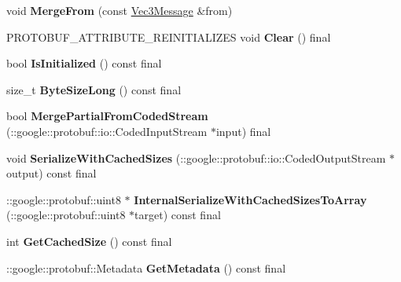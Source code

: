\begin{DoxyCompactItemize}
\item 
\mbox{\label{classtbMath_1_1Vec3Message_a94ba6277b00e325f34079ec48dfb952a}} 
void {\bfseries Merge\+From} (const \hyperlink{classtbMath_1_1Vec3Message}{Vec3\+Message} \&from)
\item 
\mbox{\label{classtbMath_1_1Vec3Message_a61f1a4a8bde658cd00386e0e2fcf8a51}} 
P\+R\+O\+T\+O\+B\+U\+F\+\_\+\+A\+T\+T\+R\+I\+B\+U\+T\+E\+\_\+\+R\+E\+I\+N\+I\+T\+I\+A\+L\+I\+Z\+ES void {\bfseries Clear} () final
\item 
\mbox{\label{classtbMath_1_1Vec3Message_a72c6ada0eb8a00f8761eecc580e08a82}} 
bool {\bfseries Is\+Initialized} () const final
\item 
\mbox{\label{classtbMath_1_1Vec3Message_a4ffc59a5652f0cc147211b41d767af5b}} 
size\+\_\+t {\bfseries Byte\+Size\+Long} () const final
\item 
\mbox{\label{classtbMath_1_1Vec3Message_a5313d2e95d614dc3e74ab5f2febd42de}} 
bool {\bfseries Merge\+Partial\+From\+Coded\+Stream} (\+::google\+::protobuf\+::io\+::\+Coded\+Input\+Stream $\ast$input) final
\item 
\mbox{\label{classtbMath_1_1Vec3Message_add209833c0345ca9936133b87bc17306}} 
void {\bfseries Serialize\+With\+Cached\+Sizes} (\+::google\+::protobuf\+::io\+::\+Coded\+Output\+Stream $\ast$output) const final
\item 
\mbox{\label{classtbMath_1_1Vec3Message_adad0e1398f395d78340ea0e5b31f7a7d}} 
\+::google\+::protobuf\+::uint8 $\ast$ {\bfseries Internal\+Serialize\+With\+Cached\+Sizes\+To\+Array} (\+::google\+::protobuf\+::uint8 $\ast$target) const final
\item 
\mbox{\label{classtbMath_1_1Vec3Message_aca5781f367ee27a7f5c1b0961c635bc9}} 
int {\bfseries Get\+Cached\+Size} () const final
\item 
\mbox{\label{classtbMath_1_1Vec3Message_ace144d7f9924262073740b27c3cf6468}} 
\+::google\+::protobuf\+::\+Metadata {\bfseries Get\+Metadata} () const final

\end{DoxyCompactItemize}
